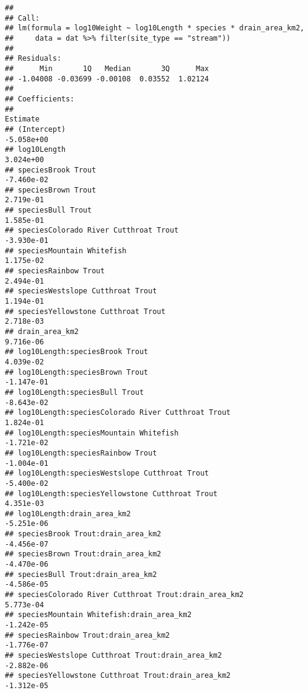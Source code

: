\documentclass[
  landscape]{article}
\begin{document}
\begin{verbatim}
## 
## Call:
## lm(formula = log10Weight ~ log10Length * species * drain_area_km2, 
##     data = dat %>% filter(site_type == "stream"))
## 
## Residuals:
##      Min       1Q   Median       3Q      Max 
## -1.04008 -0.03699 -0.00108  0.03552  1.02124 
## 
## Coefficients:
##                                                                    Estimate
## (Intercept)                                                      -5.058e+00
## log10Length                                                       3.024e+00
## speciesBrook Trout                                               -7.460e-02
## speciesBrown Trout                                                2.719e-01
## speciesBull Trout                                                 1.585e-01
## speciesColorado River Cutthroat Trout                            -3.930e-01
## speciesMountain Whitefish                                         1.175e-02
## speciesRainbow Trout                                              2.494e-01
## speciesWestslope Cutthroat Trout                                  1.194e-01
## speciesYellowstone Cutthroat Trout                                2.718e-03
## drain_area_km2                                                    9.716e-06
## log10Length:speciesBrook Trout                                    4.039e-02
## log10Length:speciesBrown Trout                                   -1.147e-01
## log10Length:speciesBull Trout                                    -8.643e-02
## log10Length:speciesColorado River Cutthroat Trout                 1.824e-01
## log10Length:speciesMountain Whitefish                            -1.721e-02
## log10Length:speciesRainbow Trout                                 -1.004e-01
## log10Length:speciesWestslope Cutthroat Trout                     -5.400e-02
## log10Length:speciesYellowstone Cutthroat Trout                    4.351e-03
## log10Length:drain_area_km2                                       -5.251e-06
## speciesBrook Trout:drain_area_km2                                -4.456e-07
## speciesBrown Trout:drain_area_km2                                -4.470e-06
## speciesBull Trout:drain_area_km2                                 -4.586e-05
## speciesColorado River Cutthroat Trout:drain_area_km2              5.773e-04
## speciesMountain Whitefish:drain_area_km2                         -1.242e-05
## speciesRainbow Trout:drain_area_km2                              -1.776e-07
## speciesWestslope Cutthroat Trout:drain_area_km2                  -2.882e-06
## speciesYellowstone Cutthroat Trout:drain_area_km2                -1.312e-05

\end{verbatim}
\end{document}
